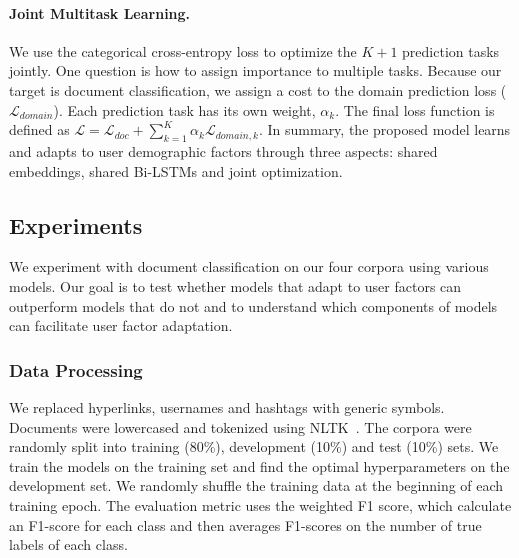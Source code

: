 \paragraph{Joint Multitask Learning.} 
We use the categorical cross-entropy loss to optimize the $K+1$ prediction tasks jointly. One question is how to assign importance to multiple tasks. Because our target is document classification, we assign a cost to the domain prediction loss ($\mathcal{L}_{domain}$). Each prediction task has its own weight, $\alpha_k$. The final loss function is defined as $\mathcal{L}= \mathcal{L}_{doc} + \sum_{k=1}^K \alpha_k \mathcal{L}_{domain, k}$. In summary, the proposed model learns and adapts to user demographic factors through three aspects: shared embeddings, shared Bi-LSTMs and joint optimization.


\subsection{Experiments}
\label{chap4:sec:dem_exp}
  
We experiment with document classification on our four corpora using various models. Our goal is to test whether models that adapt to user factors can outperform models that do not and to understand which components of models can facilitate user factor adaptation.
  
\subsubsection{Data Processing}

We replaced hyperlinks, usernames and hashtags with generic symbols. Documents were lowercased and tokenized using NLTK~\cite{bird2004nltk}. 
The corpora were randomly split into training (80\%), development (10\%) and test (10\%) sets.
We train the models on the training set and find the optimal hyperparameters on the development set. 
We randomly shuffle the training data at the beginning of each training epoch. 
The evaluation metric uses the weighted F1 score, which calculate an F1-score for each class and then averages F1-scores on the number of true labels of each class.

%
%


